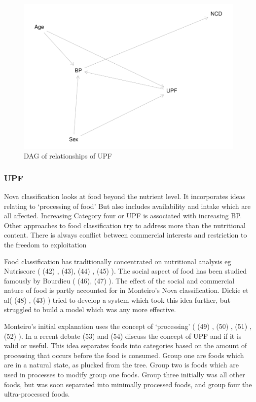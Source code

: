 \documentclass[
]{article}
\begin{document}
\begin{figure}
\centering
\includegraphics{methodandresults_files/figure-latex/fig-dag-upf-1.pdf}
\caption{DAG of relationships of UPF}
\end{figure}

\hypertarget{upf}{%
\subsubsection{UPF}\label{upf}}

Nova classification looks at food beyond the nutrient level. It
incorporates ideas relating to `processing of food' But also includes
availability and intake which are all affected. Increasing Category four
or UPF is associated with increasing BP. Other approaches to food
classification try to address more than the nutritional content. There
is always conflict between commercial interests and restriction to the
freedom to exploitation

Food classification has traditionally concentrated on nutritional
analysis eg Nutriscore ( (42) , (43), (44) , (45) ). The social aspect
of food has been studied famously by Bourdieu ( (46), (47) ). The effect
of the social and commercial nature of food is partly accounted for in
Monteiro's Nova classification. Dickie et al( (48) , (43) ) tried to
develop a system which took this idea further, but struggled to build a
model which was any more effective.

Monteiro's initial explanation uses the concept of `processing' ( (49) ,
(50) , (51) , (52) ). In a recent debate (53) and (54) discuss the
concept of UPF and if it is valid or useful. This idea separates foods
into categories based on the amount of processing that occurs before the
food is consumed. Group one are foods which are in a natural state, as
plucked from the tree. Group two is foods which are used in processes to
modify group one foods. Group three initially was all other foods, but
was soon separated into minimally processed foods, and group four the
ultra-processed foods.
\end{document}
